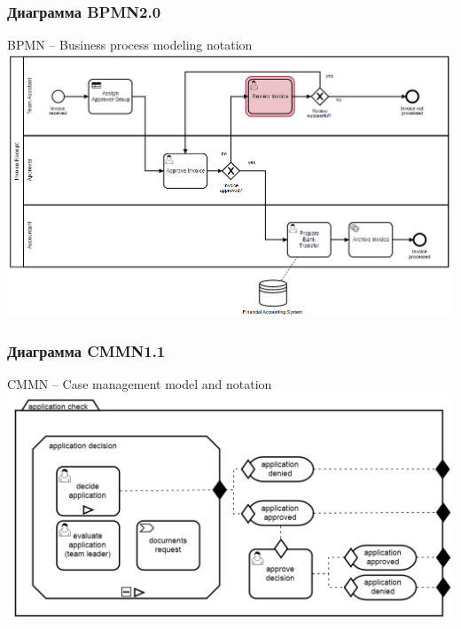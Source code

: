 \documentclass[10pt]{beamer}
\begin{document}
\begin{frame}
  \frametitle{Диаграмма BPMN2.0}
  BPMN -- Business process modeling notation
  \centering
    \includegraphics[width=1\linewidth]{qms-pics/bpmn.png}
\end{frame}
\begin{frame}
  \frametitle{Диаграмма CMMN1.1}
  CMMN -- Case management model and notation
  \centering
    \includegraphics[width=1\linewidth]{qms-pics/cmmn.png}
\end{frame}
\end{document}
